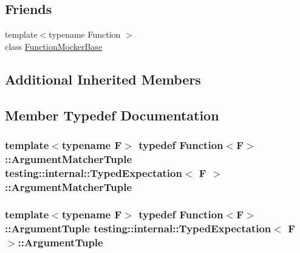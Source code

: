 \subsection*{Friends}
\begin{DoxyCompactItemize}
\item 
{\footnotesize template$<$typename Function $>$ }\\class \hyperlink{classtesting_1_1internal_1_1_typed_expectation_a1771ea4a3d92d8b2ff0f0aa6fc40ff55}{Function\+Mocker\+Base}
\end{DoxyCompactItemize}
\subsection*{Additional Inherited Members}


\subsection{Member Typedef Documentation}
\subsubsection[{\texorpdfstring{Argument\+Matcher\+Tuple}{ArgumentMatcherTuple}}]{\setlength{\rightskip}{0pt plus 5cm}template$<$typename F$>$ typedef {\bf Function}$<$F$>$\+::{\bf Argument\+Matcher\+Tuple} {\bf testing\+::internal\+::\+Typed\+Expectation}$<$ F $>$\+::{\bf Argument\+Matcher\+Tuple}}\hypertarget{classtesting_1_1internal_1_1_typed_expectation_a8f10e3906761cc5c10fa3561c6e8938e}{}\label{classtesting_1_1internal_1_1_typed_expectation_a8f10e3906761cc5c10fa3561c6e8938e}
\subsubsection[{\texorpdfstring{Argument\+Tuple}{ArgumentTuple}}]{\setlength{\rightskip}{0pt plus 5cm}template$<$typename F$>$ typedef {\bf Function}$<$F$>$\+::{\bf Argument\+Tuple} {\bf testing\+::internal\+::\+Typed\+Expectation}$<$ F $>$\+::{\bf Argument\+Tuple}}\hypertarget{classtesting_1_1internal_1_1_typed_expectation_a9a91379262d101f435809ba4556d14fa}{}\label{classtesting_1_1internal_1_1_typed_expectation_a9a91379262d101f435809ba4556d14fa}
